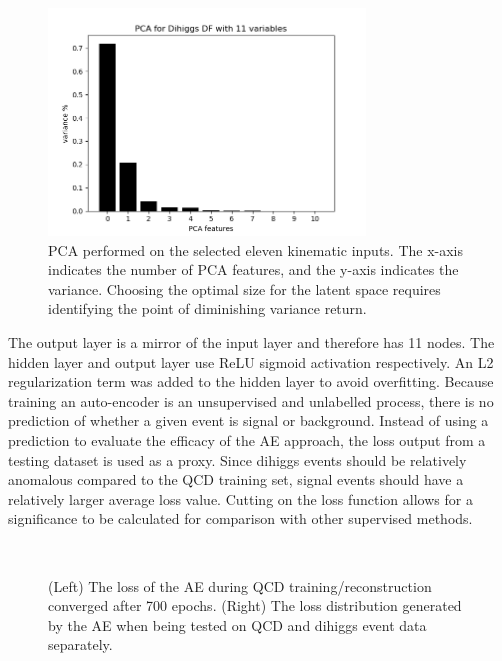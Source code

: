 \begin{figure}[!h] 
\begin{center}
\includegraphics*[width=0.75\textwidth] {AE/figures/ae_PCA_11vars}
\caption{PCA performed on the selected eleven kinematic inputs. The x-axis indicates the number of PCA features, and the y-axis indicates the variance. Choosing the optimal size for the latent space requires identifying the point of diminishing variance return.}
  \label{fig:ae_pca}
\end{center}
\end{figure}

The output layer is a mirror of the input layer and therefore has 11 nodes. The hidden layer and output layer use ReLU sigmoid activation respectively. An L2 regularization term was added to the hidden layer to avoid overfitting. %
Because training an auto-encoder is an unsupervised and unlabelled process, there is no prediction of whether a given event is signal or background. Instead of using a prediction to evaluate the efficacy of the AE approach, the loss output from a testing dataset is used as a proxy. Since dihiggs events should be relatively anomalous compared to the QCD training set, signal events should have a relatively larger average loss value. Cutting on the loss function allows for a significance to be calculated for comparison with other supervised methods.

\begin{figure}[!h] 
  \begin{center}
    \\
    \caption{(Left) The loss of the AE during QCD training/reconstruction converged after 700 epochs. (Right) The loss distribution generated by the AE when being tested on QCD and dihiggs event data separately.}    
  \label{fig:ae_trainPredLoss}
\end{center}
\end{figure}

